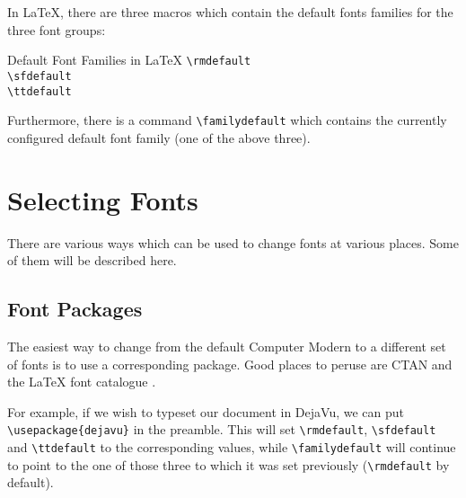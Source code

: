\documentclass[a4paper,oneside,11pt]{article}
\newcommand\compar[2]{\texttt{\textbackslash #1\{#2\}}}
\newcommand\comm[1]{\texttt{\textbackslash#1}}
\begin{document}

In \LaTeX, there are three macros which contain the default fonts families for
the three font groups:

\begin{titled-frame}
    {\textsf{Default Font Families in \LaTeX}}
    \noindent\comm{rmdefault}\\
    \comm{sfdefault}\\
    \comm{ttdefault}
\end{titled-frame}

Furthermore,  there  is  a  command \comm{familydefault}  which  contains  the
currently configured default font family (one of the above three).


\section{Selecting Fonts}
\label{sec:setting-fonts}

There  are  various  ways  which  can  be used  to  change  fonts  at  various
places. Some of them will be described here.


\subsection{Font Packages}
\label{subsec:font-packages}

The easiest way to change from the  default Computer Modern to a different set
of fonts  is to use  a corresponding package. Good  places to peruse  are CTAN
\cite{ctan:fonts} and the \LaTeX{} font catalogue \cite{tug:font-catalog}.

For  example, if  we  wish to  typeset  our  document in  DejaVu,  we can  put
\compar{usepackage}{dejavu}{} in the preamble. This will set \comm{rmdefault},
\comm{sfdefault}  and  \comm{ttdefault}  to the  corresponding  values,  while
\comm{familydefault} will continue to point to the one of those three to which
it was set previously (\comm{rmdefault} by default).
\end{document}

